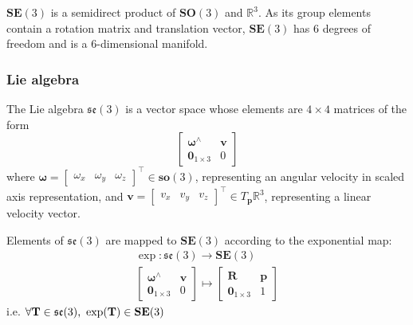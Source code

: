 		$\textbf{SE}(3)$ is a semidirect product of $\textbf{SO}(3)$ and $ \mathbb{R}^3$. As its group elements contain a rotation matrix and translation vector, $\textbf{SE}(3)$ has 6 degrees of freedom and is a 6-dimensional manifold.
			
		\subsubsection{Lie algebra}
		The Lie algebra $\mathfrak{se}(3)$ is a vector space whose elements are $4 \times 4$ matrices of the form
		\begin{equation}
			\begin{bmatrix}
				  \bm{\omega}^{\wedge}	&  \mathbf{v}\\
				  \textbf{0}_{1 \times 3} & 0						  
			\end{bmatrix}
		\end{equation}
		where $\bm{\omega} =
		\begin{bmatrix}
			\omega_x & \omega_y & \omega_z				
		\end{bmatrix}
		^\top \in \mathbf{so}(3)$, representing an angular velocity in scaled axis representation, and
		$\mathbf{v} = 
		\begin{bmatrix}
			v_x & v_y & v_z				
		\end{bmatrix}
		^\top \in T_{\mathbf{p}}\mathbb{R}^3$, representing a linear velocity vector.
		
		Elements of $\mathfrak{se}(3)$ are mapped to $\textbf{SE}(3)$ according to the exponential map:
			\begin{equation}
				\begin{split}
					\exp: \mathfrak{se}(3) \rightarrow \mathbf{SE}(3)\\
					\begin{bmatrix}
						  \bm{\omega}^{\wedge}	&  \mathbf{v}\\
						  \textbf{0}_{1 \times 3} & 0						  
					\end{bmatrix}
					\mapsto 
					\begin{bmatrix}
						  \mathbf{R}	&	\mathbf{p} \\
						  \textbf{0}_{1 \times 3}		& 	1 
					\end{bmatrix}
				\end{split}		
			\end{equation}		
			i.e. $\forall \mathbf{T} \in \mathfrak{se}(3) \textnormal{, } \exp(\mathbf{T}) \in  \mathbf{SE}(3)$
			
